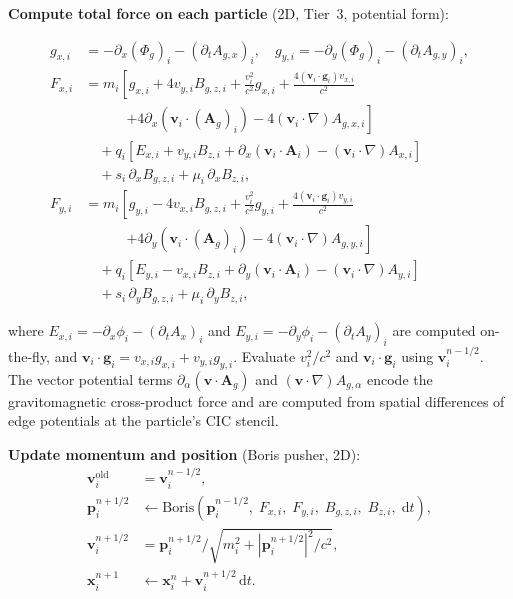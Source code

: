 \documentclass[11pt,a4paper]{article}
\newcommand{\vv}[1]{\mathbf{#1}}
\newcommand{\Phig}{\Phi_g}
\newcommand{\Ag}{\vv{A}_g}
\newcommand{\dd}{\mathrm{d}}
\begin{document}
\begin{algsteps}
  \item \textbf{Compute total force on each particle} (2D, Tier~3, potential form):
  \begin{eqbox}
  \begin{align*}
    g_{x,i} &= -\partial_x(\Phig)_{i} - (\partial_t A_{g,x})_i, \quad g_{y,i} = -\partial_y(\Phig)_{i} - (\partial_t A_{g,y})_i, \\[4pt]
    F_{x,i} &= m_i\!\left[g_{x,i}
                         + 4v_{y,i}B_{g,z,i}
                         + \frac{v_i^2}{c^2}g_{x,i}
                         + \frac{4(\vv{v}_i\cdot\vv{g}_i)v_{x,i}}{c^2}\right. \\
            &\qquad\quad \left.+ 4\partial_x(\vv{v}_i\cdot(\Ag)_{i}) - 4(\vv{v}_i\cdot\nabla)A_{g,x,i}\right] \\
            &\quad + q_i\!\left[E_{x,i} + v_{y,i}B_{z,i}
                         + \partial_x(\vv{v}_i\cdot\vv{A}_i) - (\vv{v}_i\cdot\nabla)A_{x,i}\right] \\
            &\quad + s_i\,\partial_x B_{g,z,i} + \mu_i\,\partial_x B_{z,i}, \\[6pt]
    F_{y,i} &= m_i\!\left[g_{y,i}
                         - 4v_{x,i}B_{g,z,i}
                         + \frac{v_i^2}{c^2}g_{y,i}
                         + \frac{4(\vv{v}_i\cdot\vv{g}_i)v_{y,i}}{c^2}\right. \\
            &\qquad\quad \left.+ 4\partial_y(\vv{v}_i\cdot(\Ag)_{i}) - 4(\vv{v}_i\cdot\nabla)A_{g,y,i}\right] \\
            &\quad + q_i\!\left[E_{y,i} - v_{x,i}B_{z,i}
                         + \partial_y(\vv{v}_i\cdot\vv{A}_i) - (\vv{v}_i\cdot\nabla)A_{y,i}\right] \\
            &\quad + s_i\,\partial_y B_{g,z,i} + \mu_i\,\partial_y B_{z,i},
  \end{align*}
  \end{eqbox}
  where $E_{x,i} = -\partial_x\phi_i - (\partial_t A_x)_i$ and $E_{y,i} = -\partial_y\phi_i - (\partial_t A_y)_i$ are computed on-the-fly, and $\vv{v}_i\cdot\vv{g}_i = v_{x,i}g_{x,i} + v_{y,i}g_{y,i}$.  Evaluate $v_i^2/c^2$ and $\vv{v}_i\cdot\vv{g}_i$ using $\vv{v}_i^{n-1/2}$. The vector potential terms $\partial_\alpha(\vv{v}\cdot\Ag)$ and $(\vv{v}\cdot\nabla)A_{g,\alpha}$ encode the gravitomagnetic cross-product force and are computed from spatial differences of edge potentials at the particle's CIC stencil.

  \item \textbf{Update momentum and position} (Boris pusher, 2D):
  \begin{align}
    \vv{v}_i^{\mathrm{old}} &= \vv{v}_i^{n-1/2}, \\
    \vv{p}_i^{n+1/2} &\leftarrow \text{Boris}(\vv{p}_i^{n-1/2},\; F_{x,i},\; F_{y,i},\; B_{g,z,i},\; B_{z,i},\; \dd t), \\
    \vv{v}_i^{n+1/2} &= \vv{p}_i^{n+1/2} / \sqrt{m_i^2 + |\vv{p}_i^{n+1/2}|^2/c^2}, \\
    \vv{x}_i^{n+1}   &\leftarrow \vv{x}_i^n + \vv{v}_i^{n+1/2}\,\dd t.
  \end{align}


\end{algsteps}
\end{document}
